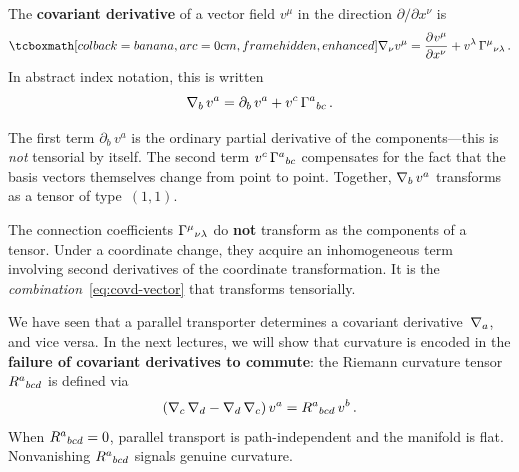 \begin{keyresult}
  The \textbf{covariant derivative} of a vector field
  $v^\mu$ in the direction $\partial/\partial x^\nu$ is
  \begin{equation}\label{eq:covd-vector}
    \eqbox{\covd_\nu v^\mu
    = \pd{v^\mu}{x^\nu} + v^\lambda\,\chris{\mu}{\nu\lambda}}\,.
  \end{equation}
  In abstract index notation, this is written
  \begin{equation}\label{eq:covd-vector-ain}
    \nabla_b\, v^a
    = \partial_b\, v^a + v^c\,\Gamma^{a}{}_{bc}\,.
  \end{equation}
\end{keyresult}

\begin{remark}
  The first term $\partial_b\,v^a$ is the ordinary partial
  derivative of the components---this is \emph{not} tensorial by
  itself.  The second term $v^c\,\Gamma^{a}{}_{bc}$ compensates for
  the fact that the basis vectors themselves change from point to
  point.  Together, $\nabla_b\, v^a$ transforms as a tensor of
  type~$(1,1)$.
\end{remark}

\begin{remark}
  The connection coefficients $\Gamma^{\mu}{}_{\nu\lambda}$ do
  \textbf{not} transform as the components of a tensor.  Under a
  coordinate change, they acquire an inhomogeneous term involving
  second derivatives of the coordinate transformation.  It is
  the \emph{combination}~\eqref{eq:covd-vector} that transforms
  tensorially.
\end{remark}

\begin{intuition}
  We have seen that a parallel transporter determines a covariant
  derivative~$\nabla_a$, and vice versa.  In the next lectures, we
  will show that curvature is encoded in the
  \textbf{failure of covariant derivatives to commute}:
  the Riemann curvature tensor $R^a{}_{bcd}$ is defined via
  \[
    (\nabla_c\,\nabla_d - \nabla_d\,\nabla_c)\,v^a
    = R^a{}_{bcd}\,v^b\,.
  \]
  When $R^a{}_{bcd} = 0$, parallel transport is path-independent
  and the manifold is flat.  Nonvanishing $R^a{}_{bcd}$
  signals genuine curvature.
\end{intuition}
